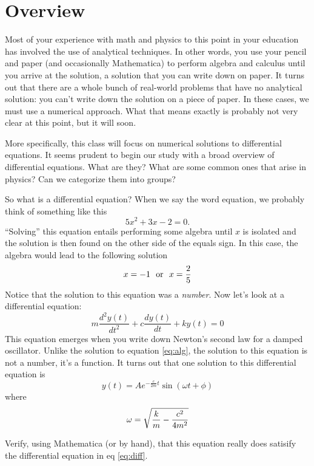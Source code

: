 \chapter[Overview]{Overview}
\label{ch:overview}

Most of your experience with math and physics to this point in your
education has involved the use of analytical techniques.  In other
words, you use your pencil and paper (and occasionally Mathematica) to
perform algebra and calculus until you arrive at the solution, a
solution that you can write down on paper.  It turns out that there
are a whole bunch of real-world problems that have no analytical
solution: you can't write down the solution on a piece of paper.  In
these cases, we must use a numerical approach.  What that means
exactly is probably not very clear at this point, but it will soon.

More specifically, this class will focus on numerical solutions to
differential equations.  It seems prudent to begin our study with a
broad overview of differential equations.  What are they?  What are
some common ones that arise in physics?  Can we categorize them into
groups?  

So what is a differential equation? When we say the word
equation, we probably think of something like this
\begin{equation}\label{eq:alg}
5 x^2 + 3x - 2 = 0.
\end{equation}
``Solving'' this equation entails performing some algebra until $x$ is
isolated  and the solution is then found on the other side of the
equals sign.  In this case, the algebra would lead to the following solution
\begin{equation}
x = -1 \mathrm{~~ or~~} x = {2 \over 5}
\end{equation}
Notice that the solution to this equation was a \textit{number}.  Now
let's look at a differential equation:
\begin{equation}\label{eq:diff}
m\frac{d^2y(t)}{dt^2} + c \frac{dy(t)}{dt} + k y(t) = 0  
\end{equation}
This equation emerges when you write down Newton's second law for a
damped oscillator. Unlike the solution to equation \eqref{eq:alg}, 
the solution to this equation is not a number, it's a function.  It
turns out that one solution to this differential equation is
\begin{equation}
y(t) = A e^{-\frac{c}{2m}t} \sin(\omega t + \phi) 
\end{equation}
where
\begin{equation}
\omega = \sqrt{ {k\over m} - {c^2\over 4 m^2} }
\end{equation}
\begin{enumerate}
\probtwo Verify, using Mathematica (or by hand), that this equation really does
satisify the differential equation in eq \eqref{eq:diff}.
\end{enumerate}

